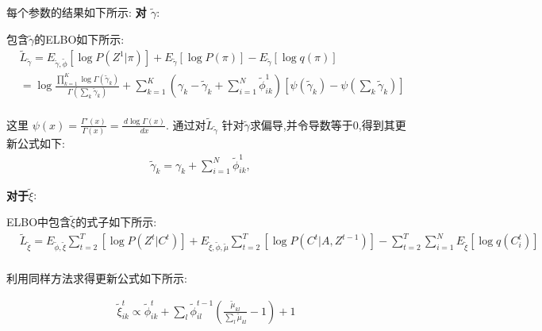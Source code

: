 每个参数的结果如下所示:
\textbf{对 $\widetilde{\gamma}$}:

包含$\widetilde{\gamma}$的ELBO如下所示:
\begin{equation}
\begin{split}
& \widetilde{L}_{\widetilde{\gamma}} = E_{\widetilde{\gamma},\widetilde{\phi}}[\log P(Z^1|\pi)] + E_{\widetilde{\gamma}}[\log P(\pi)]- E_{\widetilde{\gamma}}[\log q(\pi)] \\
& = \log{\frac{\prod_{k=1}^K \log \Gamma (\widetilde{\gamma}_k)}{\Gamma (\sum_k \widetilde{\gamma}_k)}} 
 + \sum_{k=1}^K ( \gamma_k - \widetilde{\gamma}_k + \sum_{i=1}^N \widetilde{\phi}_{ik}^1)[\psi(\widetilde{\gamma}_k) - \psi(\sum_k \widetilde{\gamma}_k)]\\
\end{split}
\end{equation}

这里 $\psi(x) = \frac{\Gamma'(x)}{\Gamma(x)} = \frac{\,d \log \Gamma(x)}{\, dx}$. 
通过对$\widetilde{L}_{\widetilde{\gamma}}$ 针对$\widetilde{\gamma}$求偏导,并令导数等于0,得到其更新公式如下:
\begin{equation}
\label{eq4}
\begin{split}
\widetilde{\gamma}_k = \gamma_k + \sum_{i=1}^N \widetilde{\phi}_{ik}^1, \quad
\end{split}
\end{equation}

\textbf{对于$\widetilde{\xi}$}:

ELBO中包含$\widetilde{\xi}$的式子如下所示:
\begin{equation}
\begin{split}
&\widetilde{L}_{\widetilde{\xi}} = E_{\widetilde{\phi},\widetilde{\xi}} \sum_{t=2}^T [\log P(Z^t|C^t)] 
+ E_{\widetilde{\xi},\widetilde{\phi},\widetilde{\mu}} \sum_{t=2}^T [\log P(C^t|A,Z^{t-1})] - \sum_{t=2}^T \sum_{i=1}^N E_{\widetilde{\xi}}[\log q(C_i^t)]\\
\end{split}
\end{equation}

利用同样方法求得更新公式如下所示:

\begin{equation}
\label{eq5}
\begin{split}
\widetilde{\xi}_{ik}^t \propto \widetilde{\phi}_{ik}^t + \sum_l \widetilde{\phi}_{il}^{t-1}(\frac{\widetilde{\mu}_{kl}}{\sum_l \widetilde{\mu}_{kl}} - 1) + 1
\end{split}
\end{equation}


